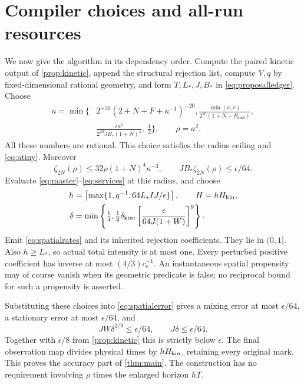\documentclass[11pt]{article}
\numberwithin{equation}{section}
\theoremstyle{definition}
\theoremstyle{remark}\newtheorem{remark}[theorem]{Remark}
\begin{document}


\section{Compiler choices and all-run resources}
\label{sec:compiler}

We now give the algorithm in its dependency order. Compute the paired kinetic
output of \cref{prop:kinetic}, append the structural rejection list, compute
$V,q$ by fixed-dimensional rational geometry, and form $T,L_*,J,B_*$ in
\eqref{eq:proposalledger}. Choose
\begin{align}
 a=\min\biggl\{&2^{-30}(2+N+F+\kappa^{-1})^{-20},
 \frac{\min(\kappa,r)}{2^{16}(1+N+P_{\max})},\nonumber\\[-2pt]
 &\frac{\epsilon\kappa^3}{2^{20}JB_*(1+N)^4},\ \frac12\biggr\},
 \qquad \rho=a^2.\label{eq:achoice}
\end{align}
All these numbers are rational. This choice satisfies the radius ceiling
and \eqref{eq:atiny}. Moreover
\[
 \zeta_{2N}(\rho)\le32\rho(1+N)^4\kappa^{-3},
 \qquad JB_*\zeta_{2N}(\rho)\le\epsilon/64.
\]
Evaluate \eqref{eq:master}--\eqref{eq:services} at this radius, and choose
\begin{align}
 h&=\left\lceil\max\{1,q^{-1},64L_*IJ/\epsilon\}\right\rceil,
 \qquad H=hH_{\rm kin},\label{eq:hchoice}\\
 \delta&=\min\left\{\tfrac14,\tfrac12\delta_{\rm kin},
       \left[\frac{\epsilon}{64J(1+W)}\right]^9\right\}.
       \label{eq:deltachoice}
\end{align}
Emit \eqref{eq:spatialrates} and its inherited rejection coefficients.
They lie in $(0,1]$. Also $h\ge L_*$, so actual total intensity is at
most one.
Every perturbed positive coefficient has inverse at most
$(4/3)c_e^{-1}$. An instantaneous spatial propensity may of course vanish
when its geometric predicate is false; no reciprocal bound for such a
propensity is asserted.

Substituting these choices into \eqref{eq:spatialerror} gives a mixing
error at most $\epsilon/64$, a stationary error at most $\epsilon/64$,
and
\[
 JW\delta^{2/9}\le\epsilon/64,\qquad J\delta\le\epsilon/64.
\]
Together with $\epsilon/8$ from \cref{prop:kinetic} this is strictly below
$\epsilon$. The final observation map divides physical times by
$hH_{\rm kin}$, retaining every original mark. This proves the accuracy
part of \cref{thm:main}. The construction has no requirement involving
$\rho$ times the enlarged horizon $hT$.
\end{document}
